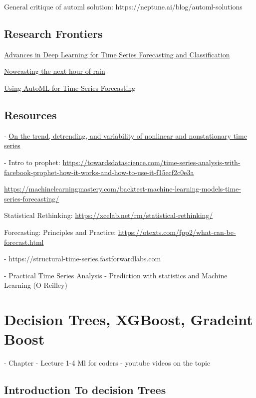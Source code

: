 \documentclass[openany]{book}
\begin{document}
General critique of automl solution: https://neptune.ai/blog/automl-solutions


\section{Research Frontiers}

\href{https://towardsdatascience.com/advances-in-deep-learning-for-time-series-forecasting-and-classification-winter-2023-edition-6617c203c1d1}{Advances in Deep Learning for Time Series Forecasting and Classification}

\href{https://www.deepmind.com/blog/nowcasting-the-next-hour-of-rain}{Nowcasting the next hour of rain
}

\href{https://ai.googleblog.com/2020/12/using-automl-for-time-series-forecasting.html}{Using AutoML for Time Series Forecasting
}

\section{Resources}


- \href{https://www.pnas.org/doi/10.1073/pnas.0701020104}{On the trend, detrending, and variability of nonlinear and nonstationary time series}

- Intro to prophet: \url{https://towardsdatascience.com/time-series-analysis-with-facebook-prophet-how-it-works-and-how-to-use-it-f15ecf2c0e3a}


\url{https://machinelearningmastery.com/backtest-machine-learning-models-time-series-forecasting/}

Statistical Rethinking: 
\url{https://xcelab.net/rm/statistical-rethinking/}

Forecasting: Principles and Practice: 
\url{https://otexts.com/fpp2/what-can-be-forecast.html}

- https://structural-time-series.fastforwardlabs.com

- Practical Time Series Analysis - Prediction with statistics and Machine  Learning (O Reilley) 



\chapter{Decision Trees, XGBoost, Gradeint Boost}

- Chapter 
- Lecture 1-4 Ml for coders 
- youtube videos on the topic 


\section{Introduction To decision Trees}
\end{document}
